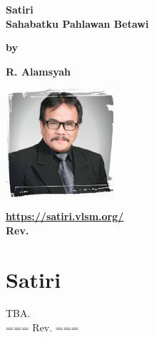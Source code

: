 \documentclass[12pt]{book}
\newcommand{\pengarangs}{%
    R. Alamsyah\\
}
\newcommand{\judul}{%
Satiri\\[13pt]
Sahabatku Pahlawan Betawi
}
\begin{document}
\begin{titlepage}
    \begin{center}    

    \vspace*{35mm}
    \textbf{\Large \judul}

    \vspace*{30mm}       
    \textbf{by}

    \vspace*{15mm}    
    \textbf{\Large \pengarangs}

    \vspace*{4.0cm}

    \begin{center}
        \includegraphics[width=40mm]{satiri.jpg}
    \end{center}

    \textbf{
       \url{https://satiri.vlsm.org/} \\[10pt]
       Rev. \rev%
    }


    \end{center}

\end{titlepage}


\tableofcontents

\newpage

\chapter*{Satiri}

\noindent
TBA.
\\[10pt]
\noindent
=== Rev. \rev ===

\newpage






\end{document}
